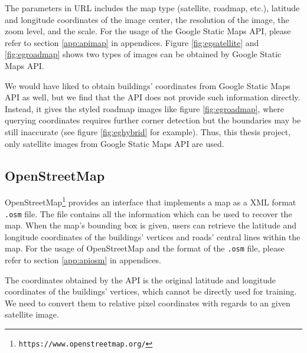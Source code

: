 The parameters in URL includes the map type (satellite, roadmap, etc.), latitude and longitude coordinates of the image center, the resolution of the image, the zoom level, and the scale. For the usage of the Google Static Maps API, please refer to section \ref{app:apimap} in appendices. Figure \ref{fig:egsatellite} and \ref{fig:egroadmap} shows two types of images can be obtained by Google Static Maps API.



We would have liked to obtain buildings' coordinates from Google Static Maps API as well, but we find that the API does not provide such information directly. Instead, it gives the styled roadmap images like figure \ref{fig:egroadmap}, where querying coordinates requires further corner detection but the boundaries may be still inaccurate (see figure \ref{fig:eghybrid} for example). Thus, this thesis project, only satellite images from Google Static Maps API are used.

\subsection{OpenStreetMap}\label{apiosm}

OpenStreetMap\footnote{\lstinline{https://www.openstreetmap.org/}} provides an interface that implements a map as a XML format \lstinline{.osm} file. The file contains all the information which can be used to recover the map. When the map's bounding box is given, users can retrieve the latitude and longitude coordinates of the buildings' vertices and roads' central lines within the map. For the usage of OpenStreetMap and the format of the \lstinline{.osm} file, please refer to section \ref{app:apiosm} in appendices.

The coordinates obtained by the API is the original latitude and longitude coordinates of the buildings' vertices, which cannot be directly used for training. We need to convert them to relative pixel coordinates with regards to an given satellite image.

